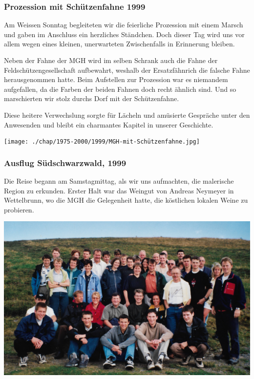 \begin{history}

    \subsubsection*{Prozession mit Schützenfahne 1999}
    Am Weissen Sonntag begleiteten wir die feierliche Prozession mit einem
    Marsch und gaben im Anschluss ein herzliches Ständchen. Doch dieser Tag wird
    uns vor allem wegen eines kleinen, unerwarteten Zwischenfalls in Erinnerung
    bleiben.

    Neben der Fahne der MGH wird im selben Schrank auch die Fahne der
    Feldschützengesellschaft aufbewahrt, weshalb der Ersatzfähnrich die falsche
    Fahne herausgenommen hatte. Beim Aufstellen zur Prozession war es niemandem
    aufgefallen, da die Farben der beiden Fahnen doch recht ähnlich sind. Und so
    marschierten wir stolz durchs Dorf mit der Schützenfahne.

    Diese heitere Verwechslung sorgte für Lächeln und amüsierte Gespräche unter
    den Anwesenden und bleibt ein charmantes Kapitel in unserer Geschichte.

    \begin{MulticolFigure}
        \centering
        \texttt{[image: ./chap/1975-2000/1999/MGH-mit-Schützenfahne.jpg]}
    \end{MulticolFigure}

    \subsubsection*{Ausflug Südschwarzwald, 1999}

    Die Reise begann am Samstagmittag, als wir uns aufmachten, die malerische
    Region zu erkunden. Erster Halt war das Weingut von Andreas Neymeyer in
    Wettelbrunn, wo die MGH die Gelegenheit hatte, die köstlichen lokalen Weine
    zu probieren.

    \begin{MulticolFigure}
        \centering
        \includegraphics[width=0.9\linewidth]{./chap/1975-2000/1999/MGH-Ausflug-Schwarzwald-1999.jpg}
    \end{MulticolFigure}


\end{history}
